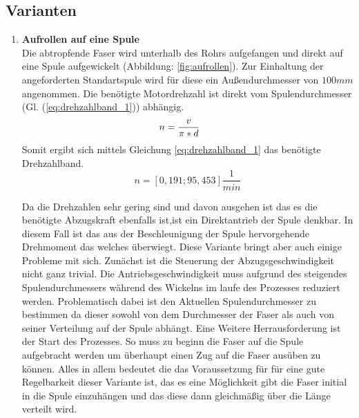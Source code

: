 \subsection{Varianten}
\begin{enumerate}[label=(\alph*)]

   \item \textbf{Aufrollen auf eine Spule} \label{Aufrollen_auf_eine Spule}\\
    Die abtropfende Faser wird unterhalb des Rohrs aufgefangen und direkt auf eine Spule aufgewickelt (Abbildung: \ref{fig:aufrollen}). Zur Einhaltung der angeforderten Standartspule wird für diese ein Außendurchmesser von $100mm$ angenommen. Die benötigte Motordrehzahl ist direkt vom Spulendurchmesser (Gl. (\ref{eq:drehzahlband_1})) abhängig.
    \begin{equation}\label{eq:drehzahlband_1}
        n = \frac{v}{ \pi * d} \hspace{3mm}\hspace{3mm} 
    \end{equation}
    Somit ergibt sich mittels Gleichung \ref{eq:drehzahlband_1}  das  benötigte Drehzahlband.
    \begin{equation*}
        n = [0,191;95,453]\frac{1}{min} 
    \end{equation*}
  
    Da die Drehzahlen sehr gering sind und davon ausgehen ist das es die benötigte Abzugskraft ebenfalls ist,ist ein Direktantrieb der Spule denkbar. In diesem Fall ist das aus der Beschleunigung der Spule hervorgehende Drehmoment das welches überwiegt. Diese Variante bringt aber auch einige Probleme mit sich. Zunächst ist die Steuerung der Abzugsgeschwindigkeit nicht ganz trivial. Die Antriebsgeschwindigkeit muss aufgrund des steigendes Spulendurchmessers während des Wickelns im laufe des Prozesses reduziert werden. Problematisch dabei ist den Aktuellen Spulendurchmesser zu bestimmen da dieser sowohl von dem Durchmesser der Faser als auch von  seiner Verteilung auf der Spule abhängt. Eine Weitere Herrausforderung ist der Start des Prozesses. So muss zu beginn die Faser auf die Spule aufgebracht werden um überhaupt einen Zug auf die Faser ausüben zu können. Alles in allem bedeutet die das Voraussetzung für für eine gute Regelbarkeit dieser Variante ist, das es eine Möglichkeit gibt die Faser initial in die Spule einzuhängen und das diese dann gleichmäßig über die Länge  verteilt wird.  
   

\end{enumerate}
